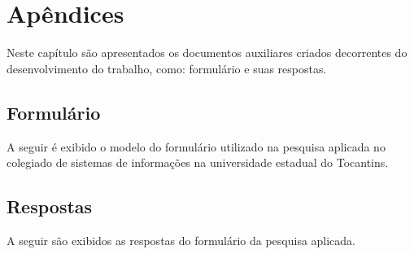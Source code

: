 

\chapter{Apêndices}\label{cap:apendice}

Neste capítulo são apresentados os documentos auxiliares criados decorrentes do desenvolvimento do trabalho, como: formulário e suas respostas.

\section{Formulário}\label{apendice:form}
A seguir é exibido o modelo do formulário utilizado na pesquisa aplicada no colegiado de sistemas de informações na universidade estadual do Tocantins.



\section{Respostas}\label{apendice:respostas}
A seguir são exibidos as respostas do formulário da pesquisa aplicada.


